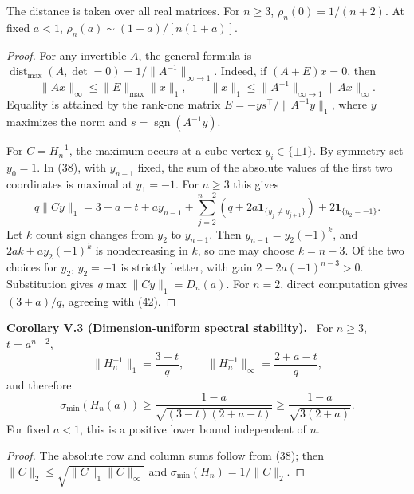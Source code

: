 \documentclass[11pt,a4paper,oneside]{book}
\newcommand{\one}{\mathbf 1}\newcommand{\ii}{\mathrm i}\newcommand{\dd}{\mathrm d}
\newcommand{\statement}[3]{\par\medskip\noindent\textbf{#1 #2 (#3).}\ }
\begin{document}
The distance is taken over all real matrices. For $n\ge3$, $\rho_n(0)=1/(n+2)$. At fixed $a<1$, $\rho_n(a)\sim(1-a)/[n(1+a)]$.
\begin{proof}For any invertible $A$, the general formula is $\operatorname{dist}_{\max}(A,\det=0)=1/\|A^{-1}\|_{\infty\to1}$. Indeed, if $(A+E)x=0$, then
\[\|Ax\|_\infty\le\|E\|_{\max}\|x\|_1,\qquad\|x\|_1\le\|A^{-1}\|_{\infty\to1}\|Ax\|_\infty.\]
Equality is attained by the rank-one matrix $E=-ys^\top/\|A^{-1}y\|_1$, where $y$ maximizes the norm and $s=\operatorname{sgn}(A^{-1}y)$.

For $C=H_n^{-1}$, the maximum occurs at a cube vertex $y_i\in\{\pm1\}$. By symmetry set $y_0=1$. In (38), with $y_{n-1}$ fixed, the sum of the absolute values of the first two coordinates is maximal at $y_1=-1$. For $n\ge3$ this gives
\[q\|Cy\|_1=3+a-t+ay_{n-1}+\sum_{j=2}^{n-2}(q+2a\one_{\{y_j\ne y_{j+1}\}})+2\one_{\{y_2=-1\}}.\]
Let $k$ count sign changes from $y_2$ to $y_{n-1}$. Then $y_{n-1}=y_2(-1)^k$, and $2ak+ay_2(-1)^k$ is nondecreasing in $k$, so one may choose $k=n-3$. Of the two choices for $y_2$, $y_2=-1$ is strictly better, with gain $2-2a(-1)^{n-3}>0$. Substitution gives $q\max\|Cy\|_1=D_n(a)$. For $n=2$, direct computation gives $(3+a)/q$, agreeing with (42).\end{proof}
\statement{Corollary}{V.3}{Dimension-uniform spectral stability} For $n\ge3$, $t=a^{n-2}$,
\[\|H_n^{-1}\|_1=\frac{3-t}q,\qquad\|H_n^{-1}\|_\infty=\frac{2+a-t}q,\]
and therefore
\[\sigma_{\min}(H_n(a))\ge\frac{1-a}{\sqrt{(3-t)(2+a-t)}}\ge\frac{1-a}{\sqrt{3(2+a)}}.\]
For fixed $a<1$, this is a positive lower bound independent of $n$.
\begin{proof}The absolute row and column sums follow from (38); then $\|C\|_2\le\sqrt{\|C\|_1\|C\|_\infty}$ and $\sigma_{\min}(H_n)=1/\|C\|_2$.\end{proof}
\end{document}
